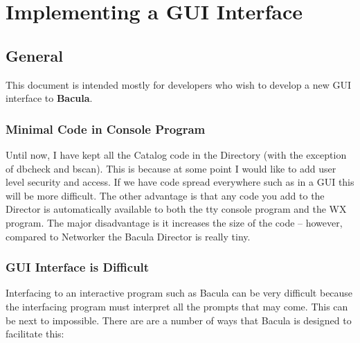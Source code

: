 
\chapter*{Implementing a GUI Interface}
\label{_ChapterStart}

\section{General}

This document is intended mostly for developers who wish to develop a new GUI
interface to {\bf Bacula}. 

\subsection{Minimal Code in Console Program}

Until now, I have kept all the Catalog code in the Directory (with the
exception of dbcheck and bscan). This is because at some point I would like to
add user level security and access. If we have code spread everywhere such as
in a GUI this will be more difficult. The other advantage is that any code you
add to the Director is automatically available to both the tty console program
and the WX program. The major disadvantage is it increases the size of the
code -- however, compared to Networker the Bacula Director is really tiny. 

\subsection{GUI Interface is Difficult}

Interfacing to an interactive program such as Bacula can be very difficult
because the interfacing program must interpret all the prompts that may come.
This can be next to impossible. There are are a number of ways that Bacula is
designed to facilitate this: 

